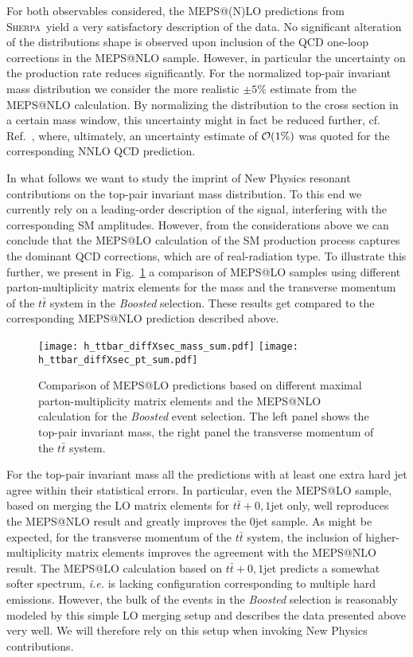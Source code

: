 \documentclass[aps,prd,amsmath,amssymb,superscriptaddress, preprintnumbers,preprint,nofootinbib,a4paper]{revtex4}
\newcommand{\ttb}{t\bar{t}}
\def\Sherpa{\textsc{Sherpa}}
\begin{document}
For both observables considered, the MEPS@(N)LO predictions from \Sherpa\ yield a very satisfactory description of
the data. No significant alteration of the distributions shape is observed upon inclusion of the QCD one-loop
corrections in the MEPS@NLO sample. However, in particular the uncertainty on the production rate reduces significantly.
For the normalized top-pair invariant mass distribution we consider the more realistic $\pm 5\%$ estimate from the
MEPS@NLO calculation. By normalizing the distribution to the cross section in a certain mass window, this
uncertainty might in fact be reduced further, cf. Ref.~\cite{Czakon:2016vfr}, where, ultimately, an uncertainty
estimate of ${\cal{O}}(1\%)$ was quoted for the corresponding NNLO QCD prediction. 

In what follows we want to study the imprint of New Physics resonant contributions on the top-pair invariant
mass distribution. To this end we currently rely on a leading-order description of the signal, interfering with the
corresponding SM amplitudes. However, from the considerations above we can conclude that the MEPS@LO calculation
of the SM production process captures the dominant QCD corrections, which are of real-radiation type. To illustrate
this further, we present in Fig.~\ref{fig:NLOxLO} a comparison of MEPS@LO samples using different parton-multiplicity
matrix elements for the mass and the transverse momentum of the $t\bar{t}$ system in the \emph{Boosted} selection.
These results get compared to the corresponding MEPS@NLO prediction described above. 

\begin{figure}[h!]
\texttt{[image: h\_ttbar\_diffXsec\_mass\_sum.pdf]}
\texttt{[image: h\_ttbar\_diffXsec\_pt\_sum.pdf]}
\caption{Comparison of MEPS@LO predictions based on different maximal parton-multiplicity matrix elements and the
  MEPS@NLO calculation for the \emph{Boosted} event selection. The left panel shows the top-pair invariant mass,
  the right panel the transverse momentum of the $\ttb$ system. }
\label{fig:NLOxLO}
\end{figure}

For the top-pair invariant mass all the predictions with at least one extra hard jet agree within their statistical errors. In particular, even the
MEPS@LO sample, based on merging the LO matrix elements for $t\bar{t}+0,1$jet only, well reproduces the MEPS@NLO result and greatly improves the 0jet sample. 
As might be expected, for the transverse momentum of the $t\bar{t}$ system, the inclusion of higher-multiplicity
matrix elements improves the agreement with the MEPS@NLO result. The MEPS@LO calculation based on $t\bar{t}+0,1$jet
predicts a somewhat softer spectrum, \emph{i.e.} is lacking configuration corresponding to multiple hard emissions.
However, the bulk of the events in the \emph{Boosted} selection is reasonably modeled by this simple LO merging
setup and describes the data presented above very well. We will therefore rely on this setup when invoking New
Physics contributions. 
\end{document}

